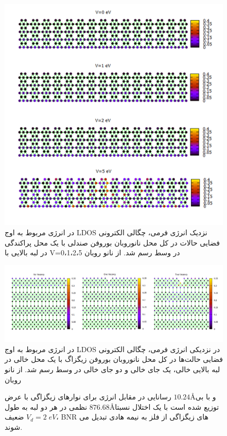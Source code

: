\begin{figure}[!ht]
  \centering
  \includegraphics[width=1\linewidth]{./figures/Slide3.PNG}
  \caption{در انرژی مربوط به اوج LDOS نزدیک انرژی فرمی، چگالی الکترونی فضایی حالات در کل محل نانوروبان بوروفن صندلی با یک محل پراکندگی در لبه بالایی با V=0،1،2،5 در وسط رسم شد. از نانو روبان}
  \label{armCSLDOS}
\end{figure}
\begin{figure}[!ht]
    \centering
    \includegraphics[width=1\linewidth]{./figures/Slide4.PNG}
    \caption{در انرژی مربوط به اوج LDOS در نزدیکی انرژی فرمی، چگالی الکترونی فضایی حالت‌ها در کل محل نانوروبان بوروفن زیگزاگ با یک محل خالی در لبه بالایی خالی، یک جای خالی و دو جای خالی در وسط رسم شد. از نانو روبان}
    \label{zigVSLDOS}
\end{figure}
\begin{figure}[!ht]
\centering

\caption{رسانایی در مقابل انرژی برای نوارهای زیگزاگی با عرض $10.24$\AA و با بی نظمی در هر دو لبه به طول $876.68 $\AA توزیع شده است
با یک اختلال نسبتا ضعیف $V_d=2\;eV$، BNR های زیگزاگی از فلز به نیمه هادی تبدیل می شوند.}
\label{zigzagdisorder}
\end{figure}

